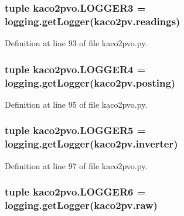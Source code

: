 \subsubsection[{L\+O\+G\+G\+E\+R3}]{\setlength{\rightskip}{0pt plus 5cm}tuple kaco2pvo.\+L\+O\+G\+G\+E\+R3 = logging.\+get\+Logger(\textquotesingle{}kaco2pv.\+readings\textquotesingle{})}\label{namespacekaco2pvo_ae935d61a481e99111efe2ed1db9bd027}


Definition at line 93 of file kaco2pvo.\+py.

\hypertarget{namespacekaco2pvo_a4fa57148f3e1066de4c3ed0a7d5e9c23}{}
\subsubsection[{L\+O\+G\+G\+E\+R4}]{\setlength{\rightskip}{0pt plus 5cm}tuple kaco2pvo.\+L\+O\+G\+G\+E\+R4 = logging.\+get\+Logger(\textquotesingle{}kaco2pv.\+posting\textquotesingle{})}\label{namespacekaco2pvo_a4fa57148f3e1066de4c3ed0a7d5e9c23}


Definition at line 95 of file kaco2pvo.\+py.

\hypertarget{namespacekaco2pvo_aa8eefb9bf8bad3161b1b878bd55236c5}{}
\subsubsection[{L\+O\+G\+G\+E\+R5}]{\setlength{\rightskip}{0pt plus 5cm}tuple kaco2pvo.\+L\+O\+G\+G\+E\+R5 = logging.\+get\+Logger(\textquotesingle{}kaco2pv.\+inverter\textquotesingle{})}\label{namespacekaco2pvo_aa8eefb9bf8bad3161b1b878bd55236c5}


Definition at line 97 of file kaco2pvo.\+py.

\hypertarget{namespacekaco2pvo_ab56cb6cd6e8dc59acbbf03cb09c7a522}{}
\subsubsection[{L\+O\+G\+G\+E\+R6}]{\setlength{\rightskip}{0pt plus 5cm}tuple kaco2pvo.\+L\+O\+G\+G\+E\+R6 = logging.\+get\+Logger(\textquotesingle{}kaco2pv.\+raw\textquotesingle{})}\label{namespacekaco2pvo_ab56cb6cd6e8dc59acbbf03cb09c7a522}


